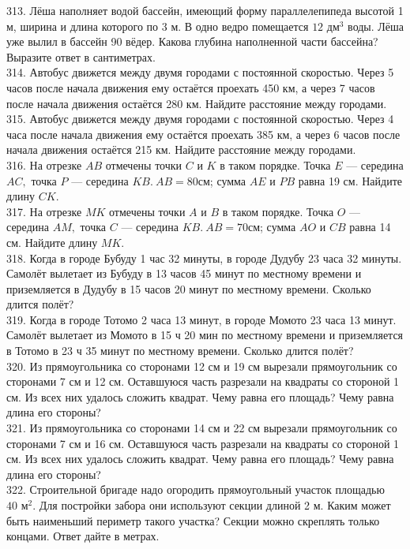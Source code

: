 \documentclass[12pt]{article}
\begin{document}
313. Лёша наполняет водой бассейн, имеющий форму параллелепипеда высотой 1 м, ширина и длина которого по 3 м. В одно ведро помещается $12\text{ дм}^3$ воды. Лёша уже вылил в бассейн 90 вёдер. Какова глубина наполненной части бассейна? Выразите ответ в сантиметрах.\\
314. Автобус движется между двумя городами с постоянной скоростью. Через 5 часов после начала движения ему остаётся проехать 450 км, а через 7 часов после начала движения остаётся 280 км. Найдите расстояние между городами.\\
315. Автобус движется между двумя городами с постоянной скоростью. Через 4 часа после начала движения ему остаётся проехать 385 км, а через 6 часов после начала движения остаётся 215 км. Найдите расстояние между городами.\\
316. На отрезке $AB$ отмечены точки $C$ и $K$ в таком порядке. Точка $E$ --- середина $AC,$ точка $P$ --- середина $KB.\ AB = 80$см; сумма $AE$ и $PB$ равна 19 см. Найдите длину $CK.$\\
317. На отрезке $MK$ отмечены точки $A$ и $B$ в таком порядке. Точка $O$ --- середина $AM,$ точка $C$ --- середина $KB.\ AB = 70$см; сумма $AO$ и $CB$ равна 14 см. Найдите длину $MK.$\\
318. Когда в городе Бубуду 1 час 32 минуты, в городе Дудубу 23 часа 32 минуты. Самолёт вылетает из Бубуду в 13 часов 45 минут по местному времени и приземляется в
Дудубу в 15 часов 20 минут по местному времени. Сколько длится полёт?\\
319. Когда в городе Тотомо 2 часа 13 минут, в городе Момото 23 часа 13 минут. Самолёт вылетает из Момото в 15 ч 20 мин по местному времени и приземляется в Тотомо в
23 ч 35 минут по местному времени. Сколько длится полёт?\\
320. Из прямоугольника со сторонами 12 см и 19 см вырезали прямоугольник со сторонами 7 см и 12 см. Оставшуюся часть разрезали на квадраты со стороной 1 см. Из всех них удалось сложить квадрат. Чему равна его площадь? Чему равна длина его стороны?\\
321. Из прямоугольника со сторонами 14 см и 22 см вырезали прямоугольник со сторонами
7 см и 16 см. Оставшуюся часть разрезали на квадраты со стороной 1 см. Из всех них удалось сложить квадрат. Чему равна его площадь? Чему равна длина его стороны?\\
322. Строительной бригаде надо огородить прямоугольный участок площадью $40\text{ м}^2.$ Для постройки забора они используют секции длиной 2 м. Каким может быть
наименьший периметр такого участка? Секции можно скреплять только концами. Ответ дайте в метрах.\\
\end{document}
